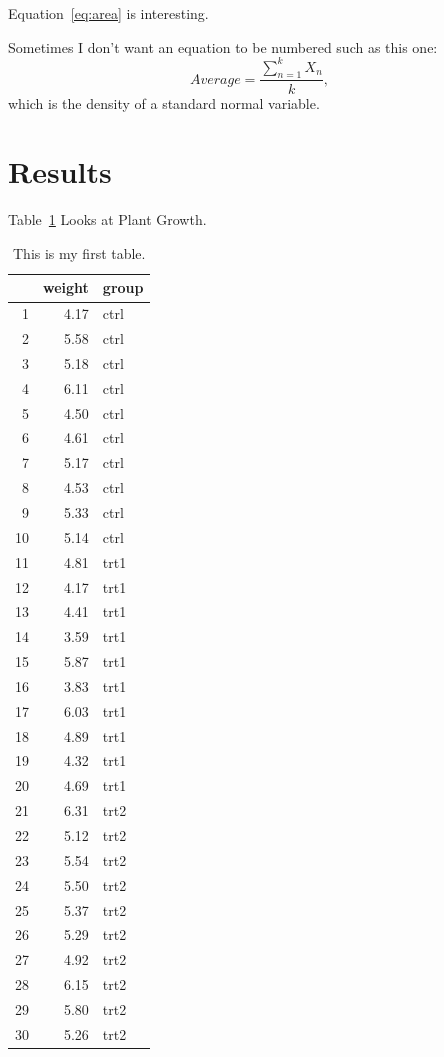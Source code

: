 \documentclass[12pt]{article}
\begin{document}
Equation~\eqref{eq:area} is interesting. \lipsum[1-4]

Sometimes I don't want an equation to be numbered such as this one:
\[
  Average = \frac{\sum_{n=1}^{k}{X_{n}}}{k},
\]
which is the density of a standard normal variable.



\section{Results}
\label{sec:resu}

Table~\ref{tab:pg} Looks at Plant Growth.
\lipsum[3]

\begin{table}[tbp]
  \caption{This is my first table.}
  \label{tab:pg}
\centering
\begin{tabular}{rrl}
  \toprule
 & weight & group \\ 
  \midrule
1 & 4.17 & ctrl \\ 
  2 & 5.58 & ctrl \\ 
  3 & 5.18 & ctrl \\ 
  4 & 6.11 & ctrl \\ 
  5 & 4.50 & ctrl \\ 
  6 & 4.61 & ctrl \\ 
  7 & 5.17 & ctrl \\ 
  8 & 4.53 & ctrl \\ 
  9 & 5.33 & ctrl \\ 
  10 & 5.14 & ctrl \\ 
  11 & 4.81 & trt1 \\ 
  12 & 4.17 & trt1 \\ 
  13 & 4.41 & trt1 \\ 
  14 & 3.59 & trt1 \\ 
  15 & 5.87 & trt1 \\ 
  16 & 3.83 & trt1 \\ 
  17 & 6.03 & trt1 \\ 
  18 & 4.89 & trt1 \\ 
  19 & 4.32 & trt1 \\ 
  20 & 4.69 & trt1 \\ 
  21 & 6.31 & trt2 \\ 
  22 & 5.12 & trt2 \\ 
  23 & 5.54 & trt2 \\ 
  24 & 5.50 & trt2 \\ 
  25 & 5.37 & trt2 \\ 
  26 & 5.29 & trt2 \\ 
  27 & 4.92 & trt2 \\ 
  28 & 6.15 & trt2 \\ 
  29 & 5.80 & trt2 \\ 
  30 & 5.26 & trt2 \\ 
   \bottomrule
\end{tabular}
\end{table}
\end{document}
